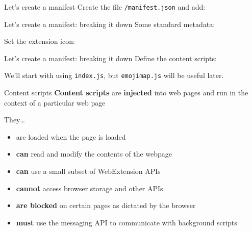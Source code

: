 \documentclass[../index.tex]{subfiles}
\begin{document}
\renewcommand{\currenttitle}{Let's create a manifest}
\begin{frame}[fragile]{\currenttitle}
  Create the file \texttt{/manifest.json} and add:
  
\end{frame}

\renewcommand{\currenttitle}{Let's create a manifest: breaking it down}
\begin{frame}[fragile]{\currenttitle}
  Some standard metadata:
  

  Set the extension icon:
  
\end{frame}

\begin{frame}[fragile]{\currenttitle}
  Define the content scripts:
  

  We'll start with using \texttt{index.js}, but \texttt{emojimap.js} will be
  useful later.
\end{frame}

\renewcommand{\currenttitle}{Content scripts}
\begin{frame}[fragile]{\currenttitle}
  \textbf{Content scripts}\footnotemark{} are \textbf{injected} into web pages and run in the
  context of a particular web page

  They\dots
  \begin{itemize}
    \small
    \item are loaded when the page is loaded
    \item \textbf{can} read and modify the contents of the webpage
    \item \textbf{can} use a small subset of WebExtension APIs
    \item \textbf{cannot} access browser storage and other APIs
    \item \textbf{are blocked} on certain pages as dictated by the browser
    \item \textbf{must} use the messaging API to communicate with background scripts
  \end{itemize}

\end{frame}
\end{document}
